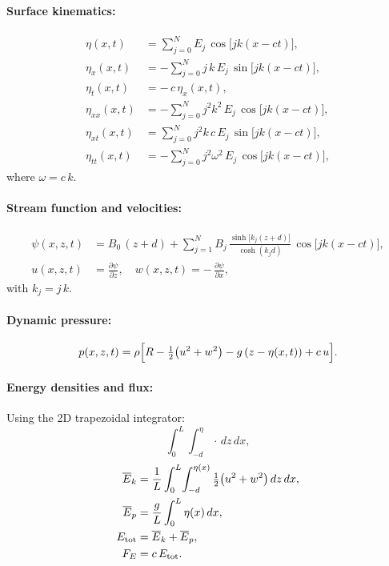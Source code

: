 \documentclass[11pt,letterpaper]{article}
\begin{document}
\paragraph{Surface kinematics:}
\begin{align}
\eta(x,t) &= \sum_{j=0}^{N} E_{j}\,\cos\bigl[jk(x - ct)\bigr], \\[0.5ex]
\eta_{x}(x,t) &= -\sum_{j=0}^{N} j\,k\,E_{j}\,\sin\bigl[jk(x - ct)\bigr], \\[0.5ex]
\eta_{t}(x,t) &= -\,c\,\eta_{x}(x,t), \\[0.5ex]
\eta_{xx}(x,t) &= -\sum_{j=0}^{N} j^{2}k^{2}\,E_{j}\,\cos\bigl[jk(x - ct)\bigr], \\[0.5ex]
\eta_{xt}(x,t) &= \sum_{j=0}^{N} j^{2}k\,c\,E_{j}\,\sin\bigl[jk(x - ct)\bigr], \\[0.5ex]
\eta_{tt}(x,t) &= -\sum_{j=0}^{N} j^{2}\omega^{2}\,E_{j}\,\cos\bigl[jk(x - ct)\bigr],
\end{align}
where \(\omega = c\,k\).

\paragraph{Stream function and velocities:}
\begin{align}
\psi(x,z,t) 
&= B_{0}\,(z + d) 
   + \sum_{j=1}^{N} B_{j}\,
     \frac{\sinh\!\bigl[k_{j}(z + d)\bigr]}{\cosh(k_{j}d)}\,
     \cos\bigl[jk(x - ct)\bigr], 
   \\[0.5ex]
u(x,z,t) &= \frac{\partial \psi}{\partial z}, 
\quad
w(x,z,t) = -\,\frac{\partial \psi}{\partial x},
\end{align}
with \(k_{j}=j\,k\).

\paragraph{Dynamic pressure:}
\begin{equation}
p(x,z,t)
= \rho\Bigl[R - \tfrac12\bigl(u^{2}+w^{2}\bigr) - g\,(z - \eta(x,t)) + c\,u\Bigr].
\end{equation}

\paragraph{Energy densities and flux:}

Using the 2D trapezoidal integrator:
\[
\int_{0}^{L}\!\int_{-d}^{\eta}\!\cdot\,dz\,dx,
\]
\begin{align}
\overline{E}_{k} 
&= \frac{1}{L}\int_{0}^{L}\!\int_{-d}^{\eta(x)} \tfrac12\bigl(u^{2}+w^{2}\bigr)\,dz\,dx, 
\\
\overline{E}_{p} 
&= \frac{g}{L}\int_{0}^{L} \eta(x)\,dx, 
\\
E_{\rm tot} 
&= \overline{E}_{k} + \overline{E}_{p}, 
\\
F_{E} 
&= c\,E_{\rm tot}.
\end{align}
\end{document}
